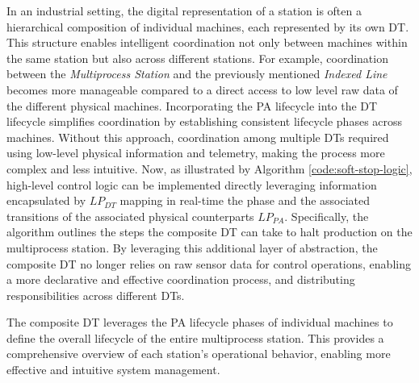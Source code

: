 In an industrial setting, the digital representation of a station is often a hierarchical composition of individual machines, each represented by its own DT. This structure enables intelligent coordination not only between machines within the same station but also across different stations. For example, coordination between the \textit{Multiprocess Station} and the previously mentioned \textit{Indexed Line} becomes more manageable compared to a direct access to low level raw data of the different physical machines. Incorporating the PA lifecycle into the DT lifecycle simplifies coordination by establishing consistent lifecycle phases across machines.
Without this approach, coordination among multiple DTs required using low-level physical information and telemetry, making the process more complex and less intuitive. Now, as illustrated by Algorithm \ref{code:soft-stop-logic}, high-level control logic can be implemented directly leveraging information encapsulated by $LP_{DT}$ mapping in real-time the phase and the associated transitions of the associated physical counterparts $LP_{PA}$. Specifically, the algorithm outlines the steps the composite DT can take to halt production on the multiprocess station. By leveraging this additional layer of abstraction, the composite DT no longer relies on raw sensor data for control operations, enabling a more declarative and effective coordination process, and distributing responsibilities across different DTs.

The composite DT leverages the PA lifecycle phases of individual machines to define the overall lifecycle of the entire multiprocess station. This provides a comprehensive overview of each station's operational behavior, enabling more effective and intuitive system management.

